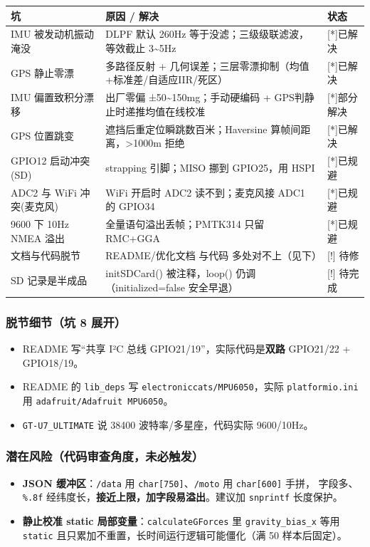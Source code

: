 \documentclass[UTF8,11pt,a4paper]{ctexart}
\begin{document}
\begin{center}\small
\begin{tabularx}{\linewidth}{@{}p{3.4cm}Xl@{}}
\toprule
\textbf{坑} & \textbf{原因 / 解决} & \textbf{状态} \\
\midrule
IMU 被发动机振动淹没 & DLPF 默认 260Hz 等于没滤；三级级联滤波，等效截止 3\textasciitilde 5Hz & [*]已解决 \\
GPS 静止零漂 & 多路径反射 + 几何误差；三层零漂抑制（均值+标准差/自适应IIR/死区） & [*]已解决 \\
IMU 偏置致积分漂移 & 出厂零偏 ±50\textasciitilde 150mg；手动硬编码 + GPS判静止时递推均值在线校准 & [*]部分解决 \\
GPS 位置跳变 & 遮挡后重定位瞬跳数百米；Haversine 算帧间距离，>1000m 拒绝 & [*]已解决 \\
GPIO12 启动冲突(SD) & strapping 引脚；MISO 挪到 GPIO25，用 HSPI & [*]已规避 \\
ADC2 与 WiFi 冲突(麦克风) & WiFi 开启时 ADC2 读不到；麦克风接 ADC1 的 GPIO34 & [*]已规避 \\
9600 下 10Hz NMEA 溢出 & 全量语句溢出丢帧；PMTK314 只留 RMC+GGA & [*]已规避 \\
文档与代码脱节 & README/优化文档 与代码 多处对不上（见下） & [!] 待修 \\
SD 记录是半成品 & initSDCard() 被注释，loop() 仍调（initialized=false 安全早退） & [!] 待完成 \\
\bottomrule
\end{tabularx}
\end{center}

\subsubsection{脱节细节（坑 8 展开）}
\begin{itemize}
  \item README 写“共享 I²C 总线 GPIO21/19”，实际代码是\textbf{双路} GPIO21/22 + GPIO18/19。
  \item README 的 \texttt{lib\_deps} 写 \texttt{electroniccats/MPU6050}，实际 \texttt{platformio.ini} 用 \texttt{adafruit/Adafruit MPU6050}。
  \item \texttt{GT-U7\_ULTIMATE} 说 38400 波特率/多星座，代码实际 9600/10Hz。
\end{itemize}

\subsubsection{潜在风险（代码审查角度，未必触发）}
\begin{itemize}
  \item \textbf{JSON 缓冲区}：\texttt{/data} 用 \texttt{char[750]}、\texttt{/moto} 用 \texttt{char[600]} 手拼，
        字段多、\texttt{\%.8f} 经纬度长，\textbf{接近上限，加字段易溢出}。建议加 \texttt{snprintf} 长度保护。
  \item \textbf{静止校准 static 局部变量}：\texttt{calculateGForces} 里 \texttt{gravity\_bias\_x} 等用 \texttt{static}
        且只累加不重置，长时间运行逻辑可能僵化（满 50 样本后固定）。
\end{itemize}
\end{document}
